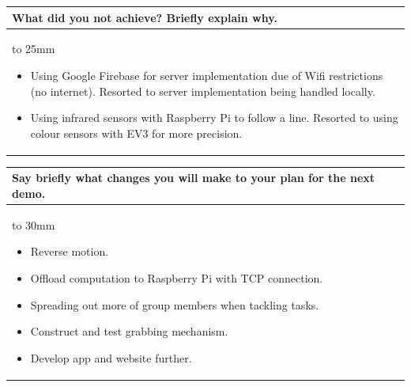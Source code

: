\documentclass[a4paper]{article}
\newcommand{\colWidth}{141mm}
\begin{document}
\begin{center}

\begin{tabular}{|p{\colWidth}|}
	\hline
	\cellcolor{blue!25}\large
	\textbf{What did you not achieve? Briefly explain why.}
	\\ \hline
	\vtop to 25mm{
	\begin{itemize}
	    \item Using Google Firebase for server implementation due of Wifi restrictions (no internet). Resorted to server implementation being handled locally. 
	    \item Using infrared sensors with Raspberry Pi to follow a line. Resorted to using colour sensors with EV3 for more precision.
	\end{itemize}
  }
  \\
  \hline
\end{tabular}
\vskip 5mm


\begin{tabular}{|p{\colWidth}|}
	\hline
	\cellcolor{blue!25}\large
	\textbf{Say briefly what changes you will make to your plan for the next demo.}
	\\ \hline
	\vtop to 30mm{
	\begin{itemize}
	    \item Reverse motion.
	    \item Offload computation to Raspberry Pi with TCP connection.
	    \item Spreading out more of group members when tackling tasks.
	    \item Construct and test grabbing mechanism.
	    \item Develop app and website further.
	\end{itemize}
  }
  \\
  \hline
\end{tabular}


\end{center}
\end{document}
